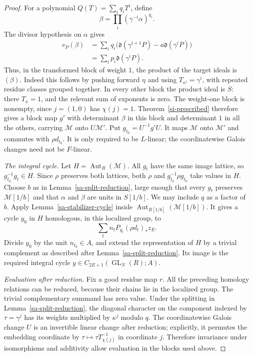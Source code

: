 \begin{proof}
For a polynomial \(Q(T)=\sum_i q_iT^i\), define
\[
                       \beta=\prod_i(\gamma^{-i}\alpha)^{q_i}.
\]
The divisor hypothesis on \(\alpha\) gives
\begin{align*}
 v_P(\beta)
 &=\sum_i q_i\bigl(\mathfrak d(\gamma^{i+1}P)
                                      -a\mathfrak d(\gamma^iP)\bigr)\\
 &=\sum_i p_i\mathfrak d(\gamma^iP).
\end{align*}
Thus, in the transformed block of weight \(1\),
the product of the target ideals is \((\beta)\).
Indeed this follows by pushing forward \(\eta\)
and using \(T_{\kappa^i}=\gamma^i\), with repeated
residue classes grouped together.
In every other block the product ideal is \(S\):
there \(T_x=1\), and the relevant sum of exponents
is zero.
The weight-one block is nonempty, since
\(j=(1,0)\) has \(\chi(j)=1\).
Theorem~\ref{si-prescribed} therefore gives a block
map \(g'\) with determinant \(\beta\) in this block
and determinant \(1\) in all the others, carrying
\(\mathcal M\) onto \(U\mathcal M'\).
Put \(g_{t_0}=U^{-1}g'U\).
It maps \(\mathcal M\) onto \(\mathcal M'\) and
commutes with \(\rho d_{t_0}\).
It is only required to be \(L\)-linear; the
coordinatewise Galois changes need not be \(F\)-linear.

\emph{The integral cycle.}
Let \(H=\operatorname{Aut}_R(\mathcal M)\).
All \(g_t\) have the same image lattice, so
\(g_{t_0}^{-1}g_t\in H\).
Since \(\rho\) preserves both lattices, both
\(\rho\) and \(g_{t_0}^{-1}\rho g_{t_0}\) take
values in \(H\).
Choose \(b\) as in Lemma~\ref{sa-split-reduction},
large enough that every \(g_t\) preserves
\(\mathcal M[1/b]\) and that \(\alpha\) and
\(\beta\) are units in \(S[1/b]\).
We may include \(q\) as a factor of \(b\).
Apply Lemma~\ref{sa-stabilizer-cycle} inside
\(\operatorname{Aut}_{R[1/b]}(\mathcal M[1/b])\).
It gives a cycle \(y_0\) in \(H\) homologous,
in this localized group, to
\[
                       \sum_t n_tP_{g_t}(\rho d_t)_*z_E.
\]
Divide \(y_0\) by the unit \(n_{t_0}\in A\),
and extend the representation of \(H\) by a trivial
complement as described after Lemma~\ref{sa-split-reduction}.
Its image is the required integral cycle
\(y\in C_{2E+1}(\operatorname{GL}_N(R);A)\).

\emph{Evaluation after reduction.}
Fix a good residue map \(r\).
All the preceding homology relations can be reduced,
because their chains lie in the localized group.
The trivial complementary summand has zero value.
Under the splitting in Lemma~\ref{sa-split-reduction},
the diagonal character on the component indexed by
\(\tau=\gamma^j\) has its weights multiplied by
\(\kappa^j\) modulo \(q\).
The coordinatewise Galois change \(U\) is an
invertible linear change after reduction; explicitly,
it permutes the embedding coordinate by
\(\tau\mapsto\tau T_{\chi(j)}^{-1}\) in coordinate \(j\).
Therefore invariance under isomorphisms and additivity
allow evaluation in the blocks used above.


\end{proof}
